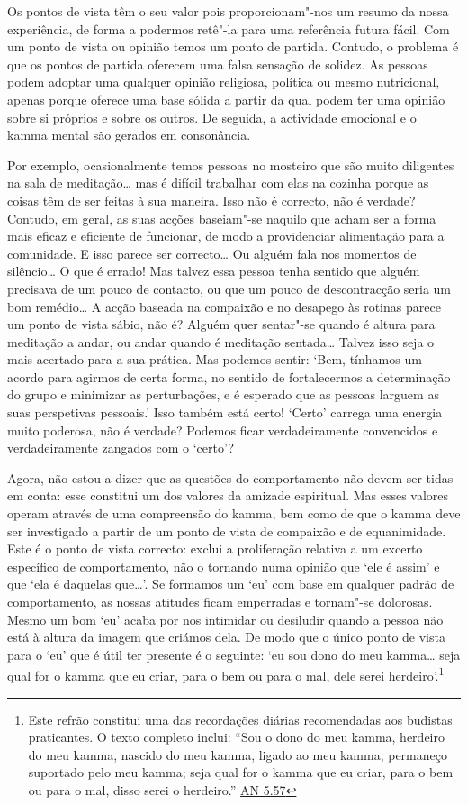 Os pontos de vista têm o seu valor pois proporcionam"-nos um resumo da nossa experiência, de forma a podermos retê"-la para uma referência futura fácil. Com um ponto de vista ou opinião temos um ponto de partida. Contudo, o problema é que os pontos de partida oferecem uma falsa sensação de solidez. As pessoas podem adoptar uma qualquer opinião religiosa, política ou mesmo nutricional, apenas porque oferece uma base sólida a partir da qual podem ter uma opinião sobre si próprios e sobre os outros. De seguida, a actividade emocional e o kamma mental são gerados em consonância.

Por exemplo, ocasionalmente temos pessoas no mosteiro que são muito diligentes na sala de meditação\ldots{} mas é difícil trabalhar com elas na cozinha porque as coisas têm de ser feitas à sua maneira. Isso não é correcto, não é verdade? Contudo, em geral, as suas acções baseiam"-se naquilo que acham ser a forma mais eficaz e eficiente de funcionar, de modo a providenciar alimentação para a comunidade. E isso parece ser correcto\ldots{} Ou alguém fala nos momentos de silêncio\ldots{} O que é errado! Mas talvez essa pessoa tenha sentido que alguém precisava de um pouco de contacto, ou que um pouco de descontracção seria um bom remédio\ldots{} A acção baseada na compaixão e no desapego às rotinas parece um ponto de vista sábio, não é? Alguém quer sentar"-se quando é altura para meditação a andar, ou andar quando é meditação sentada\ldots{} Talvez isso seja o mais acertado para a sua prática. Mas podemos sentir: `Bem, tínhamos um acordo para agirmos de certa forma, no sentido de fortalecermos a determinação do grupo e minimizar as perturbações, e é esperado que as pessoas larguem as suas perspetivas pessoais.' Isso também está certo! `Certo' carrega uma energia muito poderosa, não é verdade? Podemos ficar verdadeiramente convencidos e verdadeiramente zangados com o `certo'?

Agora, não estou a dizer que as questões do comportamento não devem ser tidas em conta: esse constitui um dos valores da amizade espiritual. Mas esses valores operam através de uma compreensão do kamma, bem como de que o kamma deve ser investigado a partir de um ponto de vista de compaixão e de equanimidade. Este é o ponto de vista correcto: exclui a proliferação relativa a um excerto específico de comportamento, não o tornando numa opinião que `ele é assim' e que `ela é daquelas que\ldots{}'. Se formamos um `eu' com base em qualquer padrão de comportamento, as nossas atitudes ficam emperradas e tornam"-se dolorosas. Mesmo um bom `eu' acaba por nos intimidar ou desiludir quando a pessoa não está à altura da imagem que criámos dela. De modo que o único ponto de vista para o `eu' que é útil ter presente é o seguinte: `eu sou dono do meu kamma\ldots{} seja qual for o kamma que eu criar, para o bem ou para o mal, dele serei herdeiro'.\footnote{Este refrão constitui uma das recordações diárias recomendadas aos budistas praticantes. O texto completo inclui: ``Sou o dono do meu kamma, herdeiro do meu kamma, nascido do meu kamma, ligado ao meu kamma, permaneço suportado pelo meu kamma; seja qual for o kamma que eu criar, para o bem ou para o mal, disso serei o herdeiro.'' \href{https://suttacentral.net/an5.57/en/bodhi}{AN 5.57}}

